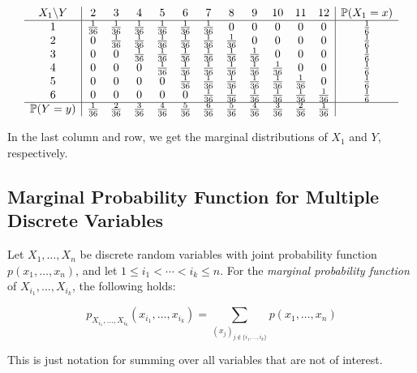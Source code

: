 \[
    \begin{array}{c|ccccccccccc|c}
    X_1 \backslash Y & 2 & 3 & 4 & 5 & 6 & 7 & 8 & 9 & 10 & 11 & 12 & \mathbb{P}(X_1 = x) \\ \hline
    1 & \tfrac{1}{36} & \tfrac{1}{36} & \tfrac{1}{36} & \tfrac{1}{36} & \tfrac{1}{36} & \tfrac{1}{36} & 0 & 0 & 0 & 0 & 0 & \tfrac{1}{6} \\
    2 & 0 & \tfrac{1}{36} & \tfrac{1}{36} & \tfrac{1}{36} & \tfrac{1}{36} & \tfrac{1}{36} & \tfrac{1}{36} & 0 & 0 & 0 & 0 & \tfrac{1}{6} \\
    3 & 0 & 0 & \tfrac{1}{36} & \tfrac{1}{36} & \tfrac{1}{36} & \tfrac{1}{36} & \tfrac{1}{36} & \tfrac{1}{36} & 0 & 0 & 0 & \tfrac{1}{6} \\
    4 & 0 & 0 & 0 & \tfrac{1}{36} & \tfrac{1}{36} & \tfrac{1}{36} & \tfrac{1}{36} & \tfrac{1}{36} & \tfrac{1}{36} & 0 & 0 & \tfrac{1}{6} \\
    5 & 0 & 0 & 0 & 0 & \tfrac{1}{36} & \tfrac{1}{36} & \tfrac{1}{36} & \tfrac{1}{36} & \tfrac{1}{36} & \tfrac{1}{36} & 0 & \tfrac{1}{6} \\
    6 & 0 & 0 & 0 & 0 & 0 & \tfrac{1}{36} & \tfrac{1}{36} & \tfrac{1}{36} & \tfrac{1}{36} & \tfrac{1}{36} & \tfrac{1}{36} & \tfrac{1}{6} \\ \hline
    \mathbb{P}(Y = y) & \tfrac{1}{36} & \tfrac{2}{36} & \tfrac{3}{36} & \tfrac{4}{36} & \tfrac{5}{36} & \tfrac{6}{36} & \tfrac{5}{36} & \tfrac{4}{36} & \tfrac{3}{36} & \tfrac{2}{36} & \tfrac{1}{36} &
    \end{array}
\]

In the last column and row, we get the marginal distributions of \(X_1\) and \(Y\), respectively.

\subsection{Marginal Probability Function for Multiple Discrete Variables}

Let \( X_1, \ldots, X_n \) be discrete random variables with joint probability function
\( p(x_1, \ldots, x_n) \), and let \( 1 \le i_1 < \cdots < i_k \le n \).
For the \emph{marginal probability function} of \( X_{i_1}, \ldots, X_{i_k} \), the following holds:

\[
    p_{X_{i_1}, \ldots, X_{i_k}}(x_{i_1}, \ldots, x_{i_k})
    = \sum_{(x_j)_{j \notin \{i_1, \ldots, i_k\}}} p(x_1, \ldots, x_n)
\]

This is just notation for summing over all variables that are not of interest.


